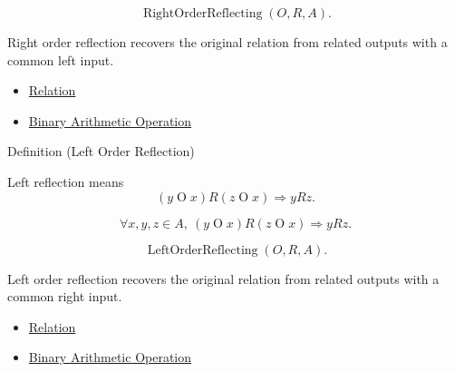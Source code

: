 \begin{remark*}
\[
\operatorname{RightOrderReflecting}(O,R,A).
\]
\end{remark*}

\begin{remark*}[Interpretation]
Right order reflection recovers the original relation from related outputs
with a common left input.
\end{remark*}

\begin{dependencies}
\begin{itemize}
  \item \hyperref[def:relation]{Relation}
  \item \hyperref[def:binary-arithmetic-operation]{Binary Arithmetic Operation}
\end{itemize}
\end{dependencies}

\begin{definitionbox}{Definition (Left Order Reflection)}
\begin{definition}
\label{def:left-order-reflection}
Left reflection means
\[
(y\mathbin{O}x)R(z\mathbin{O}x) \Longrightarrow yRz.
\]
\end{definition}
\end{definitionbox}

\begin{remark*}
\[
\forall x,y,z\in A,\ (y\mathbin{O}x)R(z\mathbin{O}x) \Longrightarrow yRz.
\]
\end{remark*}

\begin{remark*}
\[
\operatorname{LeftOrderReflecting}(O,R,A).
\]
\end{remark*}

\begin{remark*}[Interpretation]
Left order reflection recovers the original relation from related outputs
with a common right input.
\end{remark*}

\begin{dependencies}
\begin{itemize}
  \item \hyperref[def:relation]{Relation}
  \item \hyperref[def:binary-arithmetic-operation]{Binary Arithmetic Operation}
\end{itemize}
\end{dependencies}

